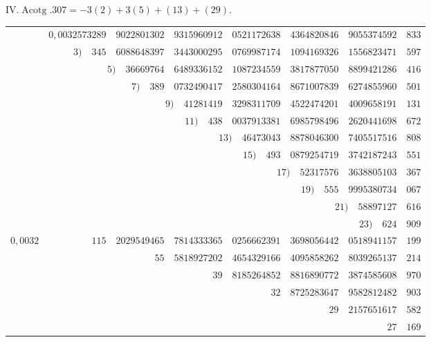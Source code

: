 \par{}
%
\begin{center}IV.\quad $\operatorname{Acotg}.307=-3(2)+3(5)+(13)+(29).$\end{center}
\begingroup\fontsize{8.5}{11}\selectfont\setlength{\tabcolsep}{2pt}
\begin{longtable}{@{}rrrrrrrr@{}}
\hline
 & $0{,}0032573289$ & $9022801302$ & $9315960912$ & $0521172638$ & $4364820846$ & $9055374592$ & $833$\\
 & $3)\quad 345$ & $6088648397$ & $3443000295$ & $0769987174$ & $1094169326$ & $1556823471$ & $597$\\
 & \multicolumn{2}{r}{$5)\quad 36669764$} & $6489336152$ & $1087234559$ & $3817877050$ & $8899421286$ & $416$\\
 & \multicolumn{2}{r}{$7)\quad 389$} & $0732490417$ & $2580304164$ & $8671007839$ & $6274855960$ & $501$\\
 &  & \multicolumn{2}{r}{$9)\quad 41281419$} & $3298311709$ & $4522474201$ & $4009658191$ & $131$\\
 &  & \multicolumn{2}{r}{$11)\quad 438$} & $0037913381$ & $6985798496$ & $2620441698$ & $672$\\
 &  &  & \multicolumn{2}{r}{$13)\quad 46473043$} & $8878046300$ & $7405517516$ & $808$\\
 &  &  & \multicolumn{2}{r}{$15)\quad 493$} & $0879254719$ & $3742187243$ & $551$\\
 &  &  &  & \multicolumn{2}{r}{$17)\quad 52317576$} & $3638805103$ & $367$\\
 &  &  &  & \multicolumn{2}{r}{$19)\quad 555$} & $9995380734$ & $067$\\
 &  &  &  &  & \multicolumn{2}{r}{$21)\quad 58897127$} & $616$\\
 &  &  &  &  & \multicolumn{2}{r}{$23)\quad 624$} & $909$\\
\hline
$0{,}0032$ & $115$ & $2029549465$ & $7814333365$ & $0256662391$ & $3698056442$ & $0518941157$ & $199$\\
 &  & $55$ & $5818927202$ & $4654329166$ & $4095858262$ & $8039265137$ & $214$\\
 &  &  & $39$ & $8185264852$ & $8816890772$ & $3874585608$ & $970$\\
 &  &  &  & $32$ & $8725283647$ & $9582812482$ & $903$\\
 &  &  &  &  & $29$ & $2157651617$ & $582$\\
 &  &  &  &  &  & $27$ & $169$\\

\end{longtable}
